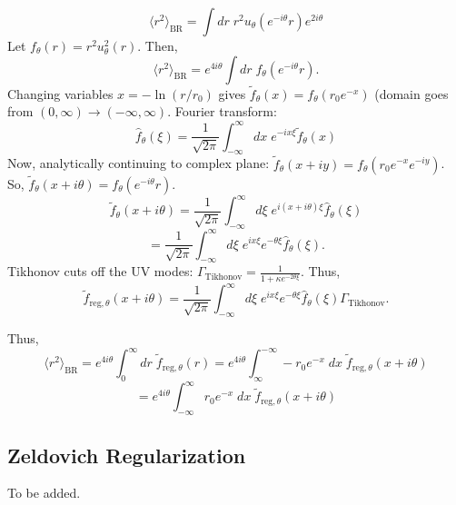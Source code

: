$$
\langle r^2 \rangle_{\text{BR}} = \int dr\; r^2 u_\theta(e^{-i\theta}r)e^{2i\theta}
$$
Let $f_\theta(r) = r^2 u^2_\theta(r)$. Then, 
$$
\langle r^2 \rangle_{\text{BR}} = e^{4i\theta}\int dr\; f_\theta(e^{-i\theta} r).
$$
Changing variables $x=-\ln(r/r_0)$ gives $\tilde{f}_\theta(x)=f_\theta(r_0e^{-x})$ (domain goes from $(0, \infty)\rightarrow (-\infty,\infty)$. Fourier transform:
$$
\hat{f}_\theta(\xi) = \frac{1}{\sqrt{2\pi}} \int_{-\infty}^\infty dx\; e^{-ix\xi}\tilde{f}_\theta(x)
$$
Now, analytically continuing to complex plane: $\tilde{f}_\theta(x+iy)=f_\theta(r_0e^{-x}e^{-iy})$. So, $\tilde{f}_\theta(x+i\theta) = f_\theta(e^{-i\theta}r)$.
$$
\tilde{f}_\theta(x + i\theta) = \frac{1}{\sqrt{2\pi}} \int_{-\infty}^\infty d\xi\; e^{i(x+i\theta)\xi}\hat{f}_\theta(\xi)
$$
$$
= \frac{1}{\sqrt{2\pi}} \int_{-\infty}^\infty d\xi\; e^{ix\xi}e^{-\theta\xi}\hat{f}_\theta(\xi).
$$
Tikhonov cuts off the UV modes: $\Gamma_{\text{Tikhonov}} = \frac{1}{1+\kappa e^{-2\theta\xi}}$. Thus,
$$
\tilde{f}_{\text{reg},\theta}(x + i\theta)=  \frac{1}{\sqrt{2\pi}} \int_{-\infty}^\infty d\xi\; e^{ix\xi}e^{-\theta\xi}\hat{f}_\theta(\xi)\Gamma_{\text{Tikhonov}}.
$$

Thus,
$$
\langle r^2\rangle_{\text{BR}} = e^{4i\theta} \int_0^\infty dr \;\tilde{f}_{\text{reg},\theta}(r) = e^{4i\theta}\int_\infty^{-\infty}-r_0e^{-x}\;dx\;\tilde{f}_{\text{reg},\theta}(x+i\theta)
$$
$$
= e^{4i\theta}\int_{-\infty}^{\infty}r_0e^{-x}\;dx\;\tilde{f}_{\text{reg},\theta}(x+i\theta)
$$
\subsection{Zeldovich Regularization}
To be added.
